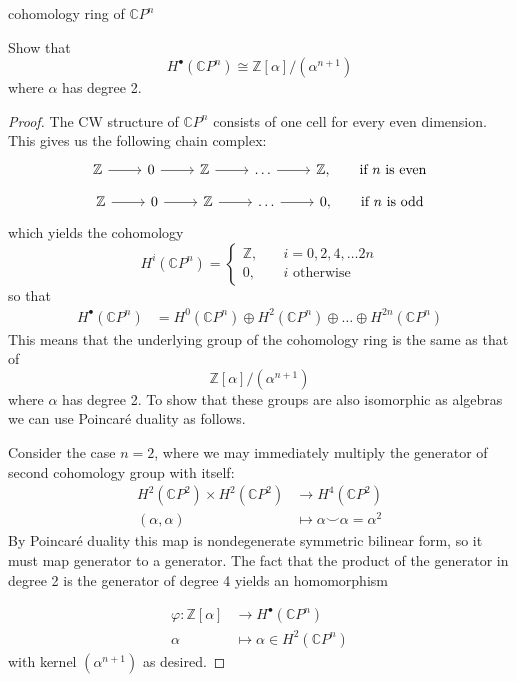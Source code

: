 \documentclass{article}
\numberwithin{equation}{section}
\newcommand{\Z}{\mathbb{Z}}
\newcommand{\C}{\mathbb{C}}
\begin{document}
	{\Large cohomology ring of $\C P^n$}
	\begin{exercise}
		Show that
		\[H^\bullet(\C P^n)\cong \Z[\alpha]/(\alpha^{n+1})\]
		where $\alpha$ has degree 2.
	\end{exercise}
\begin{proof}
		The CW structure of $\C P^n$ consists of one cell for every even dimension. This gives us the following chain complex:
	\[\begin{tikzcd}
		\Z\arrow[r]&0\arrow[r]&\Z\arrow[r]&\ldots\arrow[r]&\Z,\qquad\text{if }n\text{ is even}
	\end{tikzcd}\]
	\[\begin{tikzcd}
		\Z\arrow[r]&0\arrow[r]&\Z\arrow[r]&\ldots\arrow[r]&0,\qquad\text{if }n\text{ is odd}
	\end{tikzcd}\]
	which yields the cohomology
	\[H^i(\C P^n)=\begin{cases}
		\Z,\quad&i=0,2,4,\ldots 2n\\
		0,\quad&i\text{ otherwise}
	\end{cases}\]
	so that
	\begin{align*}
		H^\bullet(\C P^n)&=H^0(\C P^n)\oplus H^2(\C P^n)\oplus\ldots\oplus H^{2n}(\C P^{n})
	\end{align*}
	This means that the underlying group of the cohomology ring is the same as that of
	\[\Z[\alpha]/(\alpha^{n+1})\]
	where $\alpha$ has degree 2. To show that these groups are also isomorphic as algebras we can use Poincar\'e duality as follows.
	
	Consider the case $n=2$, where we may immediately multiply the generator of second cohomology group with itself:
	\begin{align*}
		H^2(\C P^2)\times H^2(\C P^2)&\to H^4(\C P^2)\\
		(\alpha,\alpha)\qquad\quad&\mapsto\alpha\smile\alpha =\alpha^2
	\end{align*}
	By Poincar\'e duality this map is nondegenerate symmetric bilinear form, so it must map generator to a generator. {\color{blue-violet}The fact that the product of the generator in degree 2 is the generator of degree 4} yields an homomorphism

	\begin{align*}
		\varphi:\Z[\alpha]&\to H^\bullet(\C P^n)\\
		\alpha&\mapsto\alpha\in H^2(\C P^n)
	\end{align*}
	with kernel $(\alpha^{n+1})$ as desired.
	

\end{proof}
\end{document}
